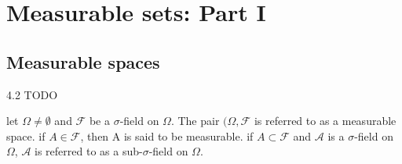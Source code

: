 \chapter{Measurable sets: Part I}%
\label{cha:Measurable sets: Part I}
\section{Measurable spaces}%
\label{sec:Measurable spaces}

\begin{definition}[]
    \label{def:4.2}
    4.2 TODO
\end{definition}
\begin{definition}
    \label{def:4.3}
    let $\Omega \neq \emptyset$ and $\mathcal{F}$ be a $\sigma$-field on $\Omega$. The pair $(\Omega, \mathcal{F}$ is referred 
    to as a measurable space. if $A \in \mathcal{F}$, then A is said to be measurable. if $A\subset \mathcal{F}$ and
    $\mathcal{A}$ is a $\sigma$-field on $\Omega$, $\mathcal{A}$ is referred to as a sub-$\sigma$-field on $\Omega$.
    
\end{definition}
